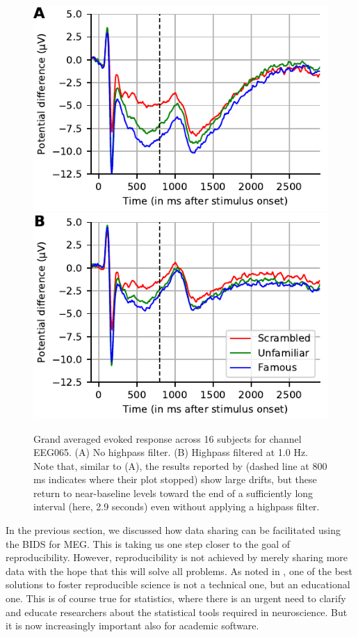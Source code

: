 \begin{figure}[t]
  \centering
  \includegraphics[width=0.7\linewidth]{figures/grand_average_highpass-NoneHz.pdf}\\
  \includegraphics[width=0.7\linewidth]{figures/grand_average_highpass-1Hz.pdf}
\caption[Grand averaged evoked response across 16 subjects.]{Grand averaged evoked response across 16 subjects for channel EEG065.
(A) No highpass filter. (B) Highpass filtered at 1.0 Hz. Note that, similar to (A), the results reported by \cite{wakeman2015multi} (dashed line at 800 ms indicates where their plot stopped) show large drifts, but these return to near-baseline levels toward the end of a sufficiently long interval (here, 2.9 seconds) even without applying a highpass filter.}
\label{fig:sommaire:grand_average}
\end{figure}  

In the previous section, we discussed how data sharing can be facilitated using the \ac{BIDS} for \ac{MEG}. This is taking us one step closer to the goal of reproducibility. However, reproducibility is not achieved by merely sharing more data with the hope that this will solve all problems. As noted in \citet{baker20161}, one of the best solutions to foster reproducible science is not a technical one, but an educational one. This is of course true for statistics, where there is an urgent need to clarify and educate researchers about the statistical tools required in neuroscience. But it is now increasingly important also for academic software.

